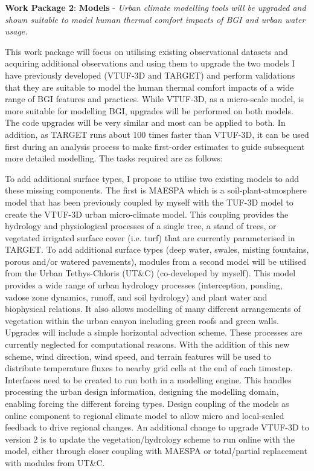 \textbf{Work Package 2}: \textbf{Models} - \emph{Urban climate modelling tools will be upgraded and shown suitable to model human thermal comfort impacts of BGI and urban water usage.  }

This work package will focus on utilising existing observational datasets and acquiring additional observations and using them to upgrade the two models I have previously developed (VTUF-3D and TARGET) and perform validations that they are suitable to model the human thermal comfort impacts of a wide range of BGI features and practices. While VTUF-3D, as a micro-scale model, is more suitable for modelling BGI, upgrades will be performed on both models. The code upgrades will be very similar and most can be applied to both. In addition, as TARGET runs about 100 times faster than VTUF-3D, it can be used first during an analysis process to make first-order estimates to guide subsequent more detailed modelling.  The tasks required are as follows:

To add additional surface types, I propose to utilise two existing models to add these missing components. The first is MAESPA\cite{Duursma2012} which is a soil-plant-atmosphere model that has been previously coupled by myself with the TUF-3D model\cite{Krayenhoff2007} to create the VTUF-3D\cite{Nice2018a} urban micro-climate model. This coupling provides the hydrology and physiological processes of a single tree, a stand of trees, or vegetated irrigated surface cover (i.e. turf) that are currently parameterised in TARGET. To add additional surface types (deep water, swales, misting fountains, porous and/or watered pavements), modules from a second model will be utilised from the Urban Tethys-Chloris (UT\&C)\cite{Meili2020} (co-developed by myself). This model provides a wide range of urban hydrology processes (interception, ponding, vadose zone dynamics, runoff, and soil hydrology) and plant water and biophysical relations. It also allows modelling of many different arrangements of vegetation within the urban canyon including green roofs and green walls. Upgrades will include a simple horizontal advection scheme. These processes are currently neglected for computational reasons. With the addition of this new scheme, wind direction, wind speed, and terrain features will be used to distribute temperature fluxes to nearby grid cells at the end of each timestep. Interfaces need to be created to run both in a modelling engine. This handles processing the urban design information, designing the modelling domain, enabling forcing the different forcing types. Design coupling of the models as online component to regional climate model to allow micro and local-scaled feedback to drive regional changes. An additional change to upgrade VTUF-3D to version 2 is to update the vegetation/hydrology scheme to run online with the model, either through closer coupling with MAESPA\cite{Duursma2012} or total/partial replacement with modules from UT\&C\cite{Meili2020}. 

